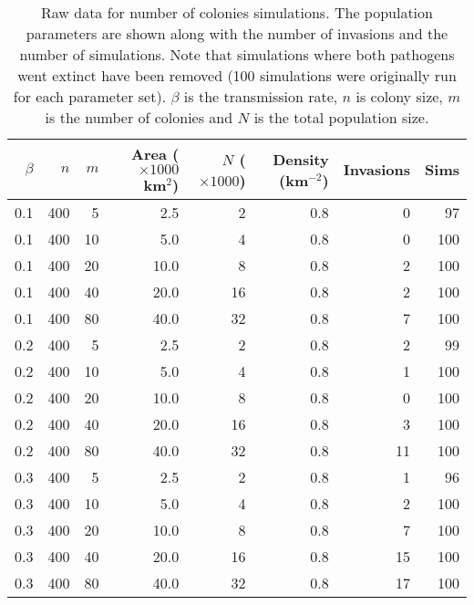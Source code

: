 \begin{table}[ht]
\centering
\caption[
Raw data for number of colonies simulations
  ]{
Raw data for number of colonies simulations.
The population parameters are shown along with the number of invasions and the number of simulations.
Note that simulations where both pathogens went extinct have been removed (100 simulations were originally run for each parameter set).
$\beta$ is the transmission rate, $n$ is colony size, $m$ is the number of colonies and $N$ is the total population size.
} 
\label{C-dens2}
\begingroup\small
\begin{tabular}{@{}rrrrrrrr@{}}
  \toprule
$\beta$ & $n$ & $m$ & Area \tiny{($\times 1000$ km$^2$)} & $N$ \tiny{($\times 1000$)} & Density \tiny{(km$^{-2}$)} & Invasions & Sims \\ 
  \midrule
0.1 & 400 & 5 & 2.5 & 2 & 0.8 & 0 & 97 \\ 
  0.1 & 400 & 10 & 5.0 & 4 & 0.8 & 0 & 100 \\ 
  0.1 & 400 & 20 & 10.0 & 8 & 0.8 & 2 & 100 \\ 
  0.1 & 400 & 40 & 20.0 & 16 & 0.8 & 2 & 100 \\ 
  0.1 & 400 & 80 & 40.0 & 32 & 0.8 & 7 & 100 \\ 
  0.2 & 400 & 5 & 2.5 & 2 & 0.8 & 2 & 99 \\ 
  0.2 & 400 & 10 & 5.0 & 4 & 0.8 & 1 & 100 \\ 
  0.2 & 400 & 20 & 10.0 & 8 & 0.8 & 0 & 100 \\ 
  0.2 & 400 & 40 & 20.0 & 16 & 0.8 & 3 & 100 \\ 
  0.2 & 400 & 80 & 40.0 & 32 & 0.8 & 11 & 100 \\ 
  0.3 & 400 & 5 & 2.5 & 2 & 0.8 & 1 & 96 \\ 
  0.3 & 400 & 10 & 5.0 & 4 & 0.8 & 2 & 100 \\ 
  0.3 & 400 & 20 & 10.0 & 8 & 0.8 & 7 & 100 \\ 
  0.3 & 400 & 40 & 20.0 & 16 & 0.8 & 15 & 100 \\ 
  0.3 & 400 & 80 & 40.0 & 32 & 0.8 & 17 & 100 \\ 
   \bottomrule
\end{tabular}
\endgroup
\end{table}





